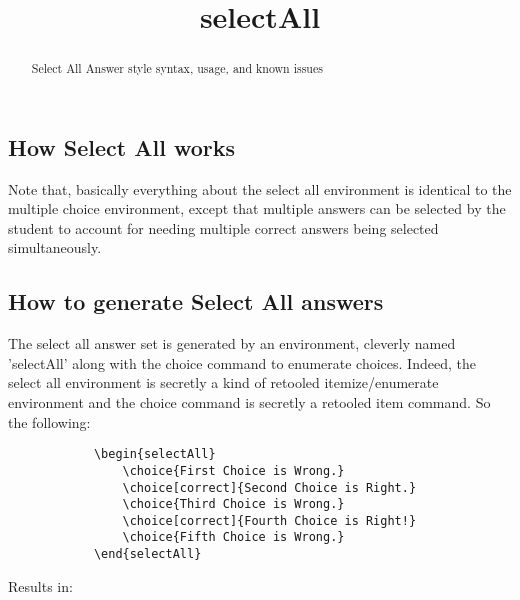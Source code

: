 \documentclass{ximera}
\title{selectAll}
\begin{document}
\begin{abstract}
    Select All Answer style syntax, usage, and known issues 
\end{abstract}
\maketitle

    \subsection*{How Select All works}
    
        Note that, basically everything about the select all environment is identical to the multiple choice environment, except that multiple answers can be selected by the student to account for needing multiple correct answers being selected simultaneously.
    
    \subsection*{How to generate Select All answers}
    
        The select all answer set is generated by an environment, cleverly named 'selectAll' along with the choice command to enumerate choices. Indeed, the select all environment is secretly a kind of retooled itemize/enumerate environment and the choice command is secretly a retooled item command. So the following:
        \begin{verbatim}
            \begin{selectAll}
                \choice{First Choice is Wrong.}
                \choice[correct]{Second Choice is Right.}
                \choice{Third Choice is Wrong.}
                \choice[correct]{Fourth Choice is Right!}
                \choice{Fifth Choice is Wrong.}
            \end{selectAll}
        \end{verbatim}
        Results in:
        \begin{selectAll}
        \end{selectAll}
        
\end{document}
